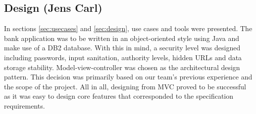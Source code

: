 \subsection{Design (Jens Carl)}
\vspace{-0.2cm}
In sections \ref{sec:usecases} and \ref{sec:design}, use cases and tools were presented. The bank application was to be written in an object-oriented style using Java and make use of a DB2 database. With this in mind, a security level was designed including passwords, input sanitation, authority levels, hidden URLs and data storage stability. Model-view-controller was chosen as the architectural design pattern. This decision was primarily based on our team's previous experience and the scope of the project. All in all, designing from MVC proved to be successful as it was easy to design core features that corresponded to the specification requirements.  

% 
